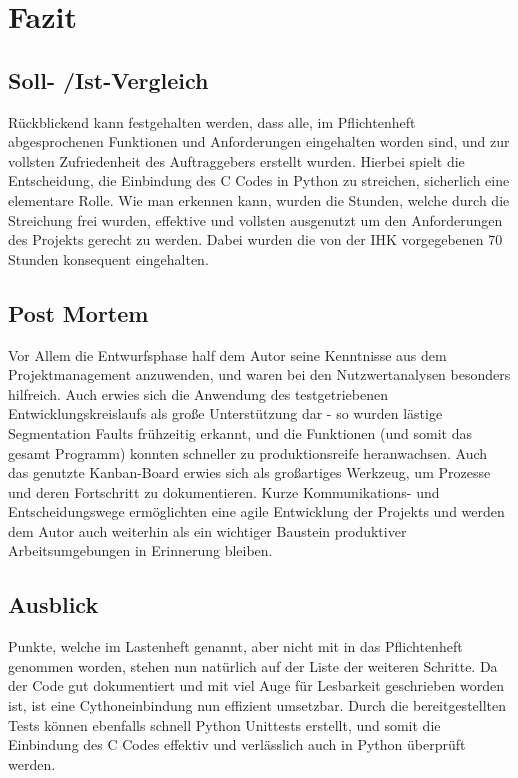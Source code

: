 \section{Fazit}
\label{section:postmortem}
\subsection{Soll- /Ist-Vergleich}
Rückblickend kann festgehalten werden, dass alle, im Pflichtenheft
abgesprochenen Funktionen und Anforderungen eingehalten worden sind,
und zur vollsten Zufriedenheit des Auftraggebers erstellt wurden. Hierbei
spielt die Entscheidung, die Einbindung des C Codes in Python zu streichen, sicherlich
eine elementare Rolle. Wie man erkennen kann, wurden die Stunden, welche durch
die Streichung frei wurden, effektive und vollsten ausgenutzt um den Anforderungen
des Projekts gerecht zu werden. Dabei wurden die von der IHK vorgegebenen 70 Stunden
konsequent eingehalten.

\subsection{Post Mortem}

Vor Allem die Entwurfsphase half dem Autor seine Kenntnisse aus dem Projektmanagement anzuwenden,
und waren bei den Nutzwertanalysen besonders hilfreich. Auch erwies sich die Anwendung des
testgetriebenen Entwicklungskreislaufs als große Unterstützung dar - so wurden lästige Segmentation Faults frühzeitig
erkannt, und die Funktionen (und somit das gesamt Programm) konnten schneller zu produktionsreife heranwachsen.
Auch das genutzte Kanban-Board erwies sich als großartiges Werkzeug, um Prozesse und deren Fortschritt zu dokumentieren.
Kurze Kommunikations- und Entscheidungswege ermöglichten eine agile Entwicklung der Projekts und werden
dem Autor auch weiterhin als ein wichtiger Baustein produktiver Arbeitsumgebungen in Erinnerung bleiben.

\subsection{Ausblick}
Punkte, welche im Lastenheft genannt, aber nicht mit in das Pflichtenheft genommen worden,
stehen nun natürlich auf der Liste der weiteren Schritte. Da der Code gut dokumentiert
und mit viel Auge für Lesbarkeit geschrieben worden ist, ist eine Cythoneinbindung nun effizient umsetzbar.
Durch die bereitgestellten Tests können ebenfalls schnell Python Unittests erstellt, und somit
die Einbindung des C Codes effektiv und verlässlich auch in Python überprüft werden.

